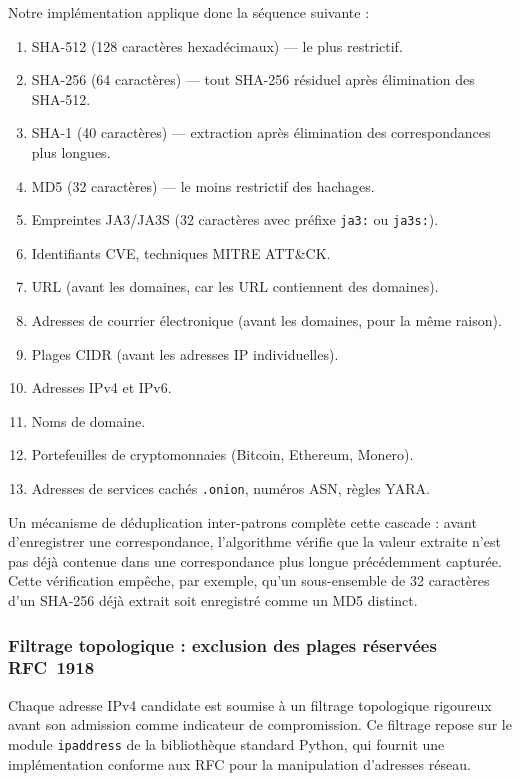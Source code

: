Notre implémentation applique donc la séquence suivante :

\begin{enumerate}
    \item SHA-512 (128 caractères hexadécimaux) --- le plus restrictif.
    \item SHA-256 (64 caractères) --- tout SHA-256 résiduel après élimination des SHA-512.
    \item SHA-1 (40 caractères) --- extraction après élimination des correspondances plus longues.
    \item MD5 (32 caractères) --- le moins restrictif des hachages.
    \item Empreintes JA3/JA3S (32 caractères avec préfixe \texttt{ja3:} ou \texttt{ja3s:}).
    \item Identifiants CVE, techniques MITRE ATT\&CK.
    \item URL (avant les domaines, car les URL contiennent des domaines).
    \item Adresses de courrier électronique (avant les domaines, pour la même raison).
    \item Plages CIDR (avant les adresses IP individuelles).
    \item Adresses IPv4 et IPv6.
    \item Noms de domaine.
    \item Portefeuilles de cryptomonnaies (Bitcoin, Ethereum, Monero).
    \item Adresses de services cachés \texttt{.onion}, numéros ASN, règles YARA.
\end{enumerate}

Un mécanisme de déduplication inter-patrons complète cette cascade : avant d'enregistrer une correspondance, l'algorithme vérifie que la valeur extraite n'est pas déjà contenue dans une correspondance plus longue précédemment capturée. Cette vérification empêche, par exemple, qu'un sous-ensemble de 32 caractères d'un SHA-256 déjà extrait soit enregistré comme un MD5 distinct.

\subsubsection{Filtrage topologique : exclusion des plages réservées RFC~1918}

Chaque adresse IPv4 candidate est soumise à un filtrage topologique rigoureux avant son admission comme indicateur de compromission. Ce filtrage repose sur le module \texttt{ipaddress} de la bibliothèque standard Python, qui fournit une implémentation conforme aux RFC pour la manipulation d'adresses réseau.

